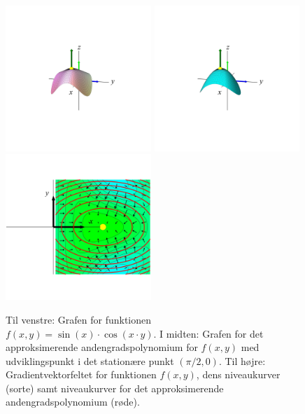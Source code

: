 \begin{figure}[ht]
\centerline{ \includegraphics[height=55mm]{plotVar2Fig2.pdf} \includegraphics[height=55mm]{plotVar2App2.pdf}  \includegraphics[height=55mm]{plotGrad2.pdf} }
\begin{center}
\caption{Til venstre: Grafen for funktionen $f(x,y) = \sin(x)\cdot\cos(x\cdot y)$.  I midten: Grafen for det approksimerende andengradspolynomium for $f(x,y)$ med udviklingspunkt i det stationære punkt $(\pi/2, 0)$. Til højre: Gradientvektorfeltet for funktionen $f(x,y)$, dens niveaukurver (sorte) samt niveaukurver for det approksimerende andengradspolynomium (røde).} \label{figStatInspec1}
\end{center}
\end{figure}



